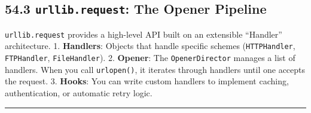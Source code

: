 \hypertarget{urllib.request-the-opener-pipeline}{%
\subsection{\texorpdfstring{54.3 \texttt{urllib.request}: The Opener
Pipeline}{54.3 urllib.request: The Opener Pipeline}}\label{urllib.request-the-opener-pipeline}}

\passthrough{\lstinline!urllib.request!} provides a high-level API built
on an extensible ``Handler'' architecture. 1. \textbf{Handlers}: Objects
that handle specific schemes (\passthrough{\lstinline!HTTPHandler!},
\passthrough{\lstinline!FTPHandler!},
\passthrough{\lstinline!FileHandler!}). 2. \textbf{Opener}: The
\passthrough{\lstinline!OpenerDirector!} manages a list of handlers.
When you call \passthrough{\lstinline!urlopen()!}, it iterates through
handlers until one accepts the request. 3. \textbf{Hooks}: You can write
custom handlers to implement caching, authentication, or automatic retry
logic.

\begin{center}\rule{0.5\linewidth}{0.5pt}\end{center}
